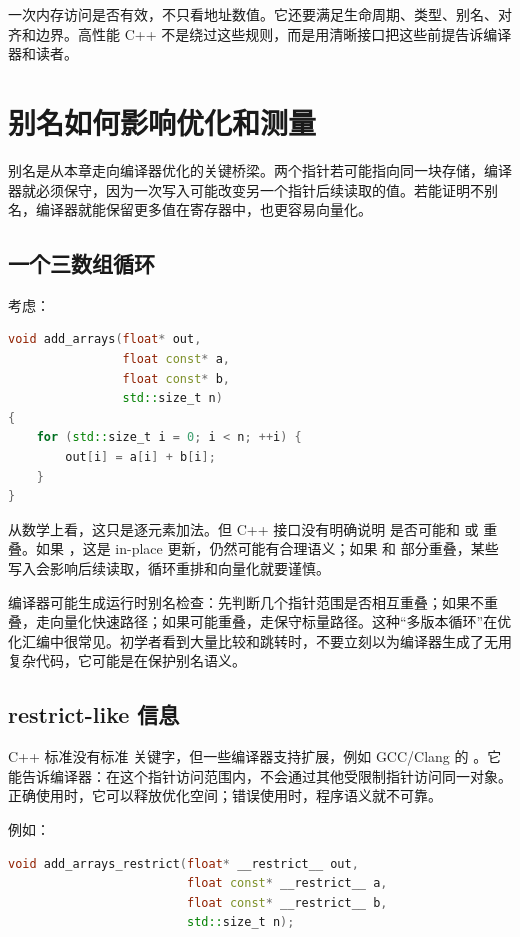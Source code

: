 \begin{keyidea}
一次内存访问是否有效，不只看地址数值。它还要满足生命周期、类型、别名、对齐和边界。高性能 C++ 不是绕过这些规则，而是用清晰接口把这些前提告诉编译器和读者。
\end{keyidea}

\section{别名如何影响优化和测量}

别名是从本章走向编译器优化的关键桥梁。两个指针若可能指向同一块存储，编译器就必须保守，因为一次写入可能改变另一个指针后续读取的值。若能证明不别名，编译器就能保留更多值在寄存器中，也更容易向量化。

\subsection{一个三数组循环}

考虑：

\begin{lstlisting}[language=C++]
void add_arrays(float* out,
                float const* a,
                float const* b,
                std::size_t n)
{
    for (std::size_t i = 0; i < n; ++i) {
        out[i] = a[i] + b[i];
    }
}
\end{lstlisting}

从数学上看，这只是逐元素加法。但 C++ 接口没有明确说明  是否可能和  或  重叠。如果 ，这是 in-place 更新，仍然可能有合理语义；如果  和  部分重叠，某些写入会影响后续读取，循环重排和向量化就要谨慎。

编译器可能生成运行时别名检查：先判断几个指针范围是否相互重叠；如果不重叠，走向量化快速路径；如果可能重叠，走保守标量路径。这种“多版本循环”在优化汇编中很常见。初学者看到大量比较和跳转时，不要立刻以为编译器生成了无用复杂代码，它可能是在保护别名语义。

\subsection{restrict-like 信息}

C++ 标准没有标准  关键字，但一些编译器支持扩展，例如 GCC/Clang 的 。它能告诉编译器：在这个指针访问范围内，不会通过其他受限制指针访问同一对象。正确使用时，它可以释放优化空间；错误使用时，程序语义就不可靠。

例如：

\begin{lstlisting}[language=C++]
void add_arrays_restrict(float* __restrict__ out,
                         float const* __restrict__ a,
                         float const* __restrict__ b,
                         std::size_t n);
\end{lstlisting}

